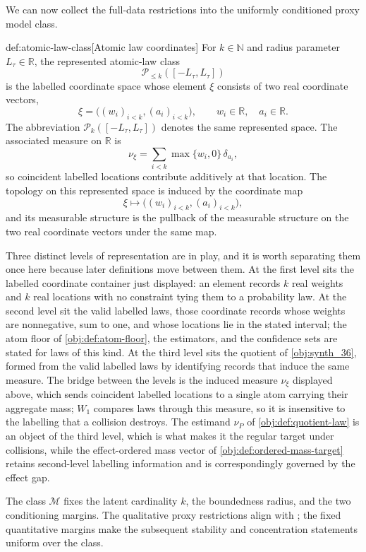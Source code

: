 \documentclass[11pt]{article}
\begin{document}
We can now collect the full-data restrictions into the uniformly conditioned proxy model class.

\begin{definitionv}{def:atomic-law-class}[Atomic law coordinates]
For \(k\in\mathbb N\) and radius parameter \(L_\tau\in\mathbb R\), the represented atomic-law class
\[
\mathcal P_{\le k}([-L_\tau,L_\tau])
\]
is the labelled coordinate space whose element \(\xi\) consists of two real coordinate vectors,
\[
\xi=\bigl((w_i)_{i<k},(a_i)_{i<k}\bigr),
\qquad
w_i\in\mathbb R,\quad a_i\in\mathbb R .
\]
The abbreviation \(\mathcal P_k([-L_\tau,L_\tau])\) denotes the same represented space. The associated measure on \(\mathbb R\) is
\[
\nu_\xi=\sum_{i<k} \max\{w_i,0\}\,\delta_{a_i},
\]
so coincident labelled locations contribute additively at that location. The topology on this represented space is induced by the coordinate map
\[
\xi\mapsto \bigl((w_i)_{i<k},(a_i)_{i<k}\bigr),
\]
and its measurable structure is the pullback of the measurable structure on the two real coordinate vectors under the same map.
\end{definitionv}
Three distinct levels of representation are in play, and it is worth separating them once here because later definitions move between them. At the first level sits the labelled coordinate container just displayed: an element records \(k\) real weights and \(k\) real locations with no constraint tying them to a probability law. At the second level sit the valid labelled laws, those coordinate records whose weights are nonnegative, sum to one, and whose locations lie in the stated interval; the atom floor of \cref{obj:def:atom-floor}, the estimators, and the confidence sets are stated for laws of this kind. At the third level sits the quotient of \cref{obj:synth_36}, formed from the valid labelled laws by identifying records that induce the same measure. The bridge between the levels is the induced measure \(\nu_\xi\) displayed above, which sends coincident labelled locations to a single atom carrying their aggregate mass; \(W_1\) compares laws through this measure, so it is insensitive to the labelling that a collision destroys. The estimand \(\nu_P\) of \cref{obj:def:quotient-law} is an object of the third level, which is what makes it the regular target under collisions, while the effect-ordered mass vector of \cref{obj:def:ordered-mass-target} retains second-level labelling information and is correspondingly governed by the effect gap.


The class \(\mathcal M\) fixes the latent cardinality \(k\), the boundedness radius, and the two conditioning margins. The qualitative proxy restrictions align with \citet{VirkMazaheriWu2026}; the fixed quantitative margins make the subsequent stability and concentration statements uniform over the class.
\end{document}
